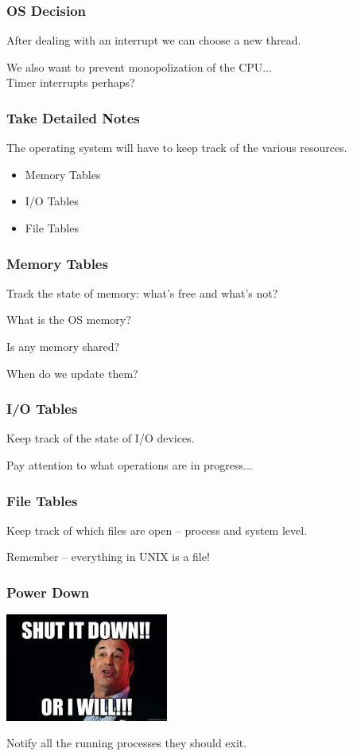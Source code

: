 \begin{frame}
\frametitle{OS Decision}
After dealing with an interrupt we can choose a new thread.

We also want to prevent monopolization of the CPU...\\
\quad Timer interrupts perhaps?

\end{frame}

\begin{frame}
\frametitle{Take Detailed Notes}

The operating system will have to keep track of the various resources.

\begin{itemize}
	\item Memory Tables
	\item I/O Tables
	\item File Tables
\end{itemize}

\end{frame}

\begin{frame}
\frametitle{Memory Tables}

Track the state of memory: what's free and what's not?

What is the OS memory?

Is any memory shared?

When do we update them?

\end{frame}

\begin{frame}
\frametitle{I/O Tables}
Keep track of the state of I/O devices.

Pay attention to what operations are in progress...

\end{frame}

\begin{frame}
\frametitle{File Tables}

Keep track of which files are open -- process and system level.

Remember -- everything in UNIX is a file!

\end{frame}

\begin{frame}
\frametitle{Power Down}

\begin{center}
	\includegraphics[width=0.4\textwidth]{images/taffer.jpg}
\end{center}

Notify all the running processes they should exit.

\end{frame}

